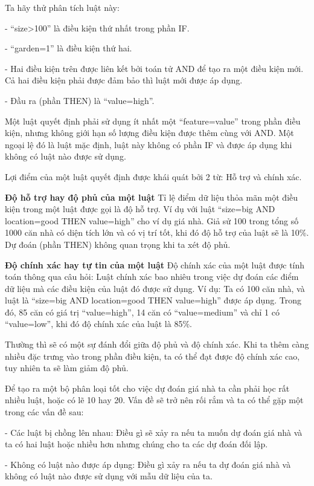 Ta hãy thử phân tích luật này:

- ``size>100'' là điều kiện thứ nhất trong phần IF.

- ``garden=1'' là điều kiện thứ hai.

- Hai điều kiện trên được liên kết bởi toán tử AND để tạo ra một điều kiện mới. Cả hai điều kiện phải được đảm bảo thì luật mới được áp dụng.

- Đầu ra (phần THEN) là ``value=high''.

Một luật quyết định phải sử dụng ít nhất một ``feature=value'' trong phần điều kiện, nhưng không giới hạn số lượng điều kiện được thêm cùng với AND. Một ngoại lệ đó là luật mặc định, luật này không có phần IF và được áp dụng khi không có luật nào được sử dụng.

Lợi điểm của một luật quyết định được khái quát bởi 2 từ: Hỗ trợ và chính xác.

\textbf{Độ hỗ trợ hay độ phủ của một luật} Tỉ lệ điểm dữ liệu thỏa mãn một điều kiện trong một luật được gọi là độ hỗ trợ. Ví dụ với luật ``size=big AND location=good THEN value=high'' cho ví dụ giá nhà. Giả sử 100 trong tổng số 1000 căn nhà có diện tích lớn và có vị trí tốt, khi đó độ hỗ trợ của luật sẽ là 10\%. Dự đoán (phần THEN) không quan trọng khi ta xét độ phủ.

\textbf{Độ chính xác hay tự tin của một luật} Độ chính xác của một luật được tính toán thông qua câu hỏi: Luật chính xác bao nhiêu trong việc dự đoán các điểm dữ liệu mà các điều kiện của luật đó được sử dụng. Ví dụ: Ta có 100 căn nhà, và luật là ``size=big AND location=good THEN value=high'' được áp dụng. Trong đó, 85 căn có giá trị ``value=high'', 14 căn có ``value=medium'' và chỉ 1 có ``value=low'', khi đó độ chính xác của luật là 85\%.

Thường thì sẽ có một sự đánh đổi giữa độ phủ và độ chính xác. Khi ta thêm càng nhiều đặc trưng vào trong phần điều kiện, ta có thể đạt được độ chính xác cao, tuy nhiên ta sẽ làm giảm độ phủ.

Để tạo ra một bộ phân loại tốt cho việc dự đoán giá nhà ta cần phải học rất nhiều luật, hoặc có lẽ 10 hay 20. Vấn đề sẽ trở nên rối rắm và ta có thể gặp một trong các vấn đề sau:

- Các luật bị chồng lên nhau: Điều gì sẽ xảy ra nếu ta muốn dự đoán giá nhà và ta có hai luật hoặc nhiều hơn nhưng chúng cho ta các dự đoán đối lập.

- Không có luật nào được áp dụng: Điều gì xảy ra nếu ta dự đoán giá nhà và không có luật nào được sử dụng với mẫu dữ liệu của ta.

